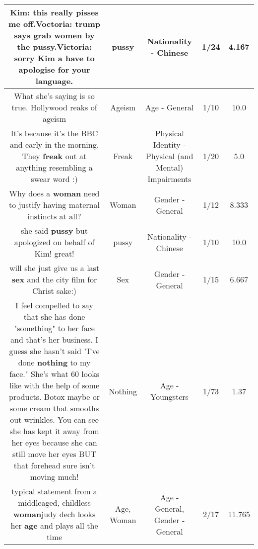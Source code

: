\documentclass[11pt]{article}
\newlength\mylength
\begin{document}
\begin{center}
\begin{longtable}{|C{.65\mylength}|C{.30\mylength}|C{.12\mylength}|C{.12\mylength}|C{.12\mylength}|}
  \small Kim: this really pisses me off.Voctoria: trump says grab women by the \textbf{pussy}.Victoria: sorry Kim a have to apologise for your language.\normalsize   & pussy & Nationality - Chinese & 1/24 & 4.167 \\  \hline
  \small What she's saying is so true. Hollywood reaks of ageism\normalsize   & Ageism & Age - General & 1/10 & 10.0 \\  \hline
  \small It's because it's the BBC and early in the morning. They \textbf{freak} out at anything resembling a swear word :)\normalsize   & Freak & Physical Identity - Physical (and Mental) Impairments & 1/20 & 5.0 \\  \hline
  \small Why does a \textbf{woman} need to justify having maternal instincts at all?\normalsize   & Woman & Gender - General & 1/12 & 8.333 \\  \hline
  \small she said \textbf{pussy} but apologized on behalf of Kim! great!\normalsize   & pussy & Nationality - Chinese & 1/10 & 10.0 \\  \hline
  \small will she just give us a last \textbf{sex} and the city film for Christ sake:)\normalsize   & Sex & Gender - General & 1/15 & 6.667 \\  \hline
  \small I feel compelled to say that she has done "something" to her face and that's her business.  I guess she hasn't said "I've done \textbf{nothing} to my face."  She's what 60 looks like with the help of some products.  Botox maybe or some cream that smooths out wrinkles.  You can see she has kept it away from her eyes because she can still move her eyes BUT that forehead sure isn't moving much!\normalsize   & Nothing & Age - Youngsters & 1/73 & 1.37 \\  \hline
  \small typical statement from a middleaged, childless \textbf{woman}judy dech looks her \textbf{age} and plays all the time\normalsize   & Age, Woman & Age - General, Gender - General & 2/17 & 11.765 \\  \hline

\end{longtable}
\end{center}
\end{document}
